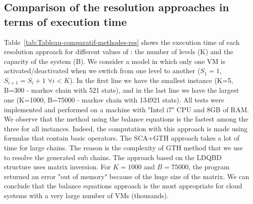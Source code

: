 \documentclass[conference]{IEEEtran}
\begin{document}
\subsection{Comparison of the resolution approaches in terms of execution time}
\label{AAA}
Table~\ref{tab:Tableau-comparatif-methodes-res} shows the execution time of each resolution approach for different values of : the number of levels (K) and the capacity of the system (B). We consider a model in which only one VM is activated/deactivated when we switch from one level to another ($S_1=1$, $S_{i+1}=S_{i}+1$ $\forall i<K$). In the first line we have the smallest instance (K=5, B=300 - markov chain with 521 stats), and in the last line we have the largest one (K=1000, B=75000 - markov chain with 134921 stats). All tests were implemented and performed on a machine with "Intel i7" CPU and 8GB of RAM. We observe that the method using the balance equations is the fastest among the three for all instances. Indeed, the computation with this approach is made using formulas that contain basic operators. The SCA+GTH approach takes a lot of time for large chains. The reason is the complexity of GTH method that we use to resolve the generated sub chains. The approach based on the LDQBD structure uses matrix inversion. For $K = 1000$ and $B = 75000$, the program returned an error "out of memory" because of the huge size of the matrix. We can conclude that the balance equations approach is the most appropriate for cloud systems with a very large number of VMs (thousands).
\end{document}
